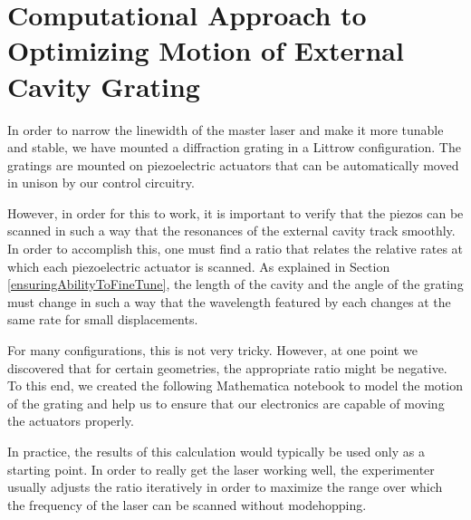 \chapter{Computational Approach to Optimizing Motion of External Cavity Grating}\label{GratingRatioAppendix}
In order to narrow the linewidth of the master laser and make it more tunable and stable, we have mounted a diffraction grating in a Littrow configuration. The gratings are mounted on piezoelectric actuators that can be automatically moved in unison by our control circuitry. 

However, in order for this to work, it is important to verify that the piezos can be scanned in such a way that the resonances of the external cavity track smoothly. In order to accomplish this, one must find a ratio that relates the relative rates at which each piezoelectric actuator is scanned. As explained in Section \ref{ensuringAbilityToFineTune}, the length of the cavity and the angle of the grating must change in such a way that the wavelength featured by each changes at the same rate for small displacements. 

For many configurations, this is not very tricky. However, at one point we discovered that for certain geometries, the appropriate ratio might be negative. To this end, we created the following Mathematica notebook to model the motion of the grating and help us to ensure that our electronics are capable of moving the actuators properly. 

In practice, the results of this calculation would typically be used only as a starting point. In order to really get the laser working well, the experimenter usually adjusts the ratio iteratively in order to maximize the range over which the frequency of the laser can be scanned without modehopping. 





